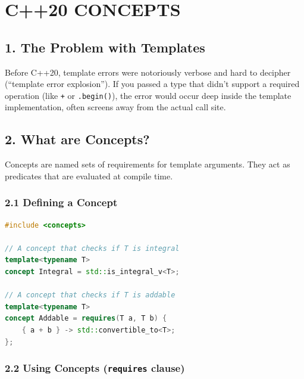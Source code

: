 \hypertarget{c20-concepts}{%
\chapter{C++20 CONCEPTS}\label{c20-concepts}}

\hypertarget{the-problem-with-templates}{%
\section{1. The Problem with
Templates}\label{the-problem-with-templates}}

Before C++20, template errors were notoriously verbose and hard to
decipher (``template error explosion''). If you passed a type that
didn't support a required operation (like \passthrough{\lstinline!+!} or
\passthrough{\lstinline!.begin()!}), the error would occur deep inside
the template implementation, often screens away from the actual call
site.

\hypertarget{what-are-concepts}{%
\section{2. What are Concepts?}\label{what-are-concepts}}

Concepts are named sets of requirements for template arguments. They act
as predicates that are evaluated at compile time.

\hypertarget{defining-a-concept}{%
\subsection{2.1 Defining a Concept}\label{defining-a-concept}}

\begin{lstlisting}[language={C++}]
#include <concepts>

// A concept that checks if T is integral
template<typename T>
concept Integral = std::is_integral_v<T>;

// A concept that checks if T is addable
template<typename T>
concept Addable = requires(T a, T b) {
    { a + b } -> std::convertible_to<T>;
};
\end{lstlisting}

\hypertarget{using-concepts-requires-clause}{%
\subsection{\texorpdfstring{2.2 Using Concepts (\texttt{requires}
clause)}{2.2 Using Concepts (requires clause)}}\label{using-concepts-requires-clause}}

